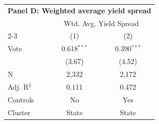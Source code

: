 \begingroup
\centering
\begin{tabular*}{\textwidth}{@{\extracolsep{\fill}}lcc}
\multicolumn{3}{l}{\textbf{Panel D: Weighted average yield spread}}\\

\addlinespace
   \toprule
    & \multicolumn{2}{c}{Wtd. Avg. Yield Spread}\\
   \cmidrule(lr){2-3}
                  & (1)           & (2)\\  
   \midrule 
   Vote           & 0.618$^{***}$ & 0.390$^{***}$\\   
                  & (3.67)       & (4.52)\\   
   \hline
   N   & 2,332         & 2,172\\  
   Adj. R$^2$ & 0.111         & 0.472\\  
   Controls                   & No & Yes\\
   Cluster              & State & State\\  
   \bottomrule
\end{tabular*}
\par\endgroup
